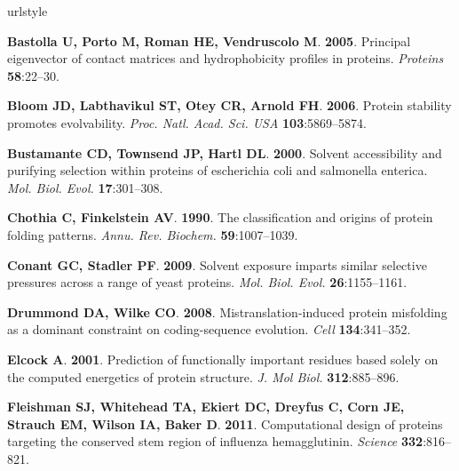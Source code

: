\documentclass[12pt]{article}
\begin{document}
\begin{thebibliography}{36}
\providecommand{\natexlab}[1]{#1}
\providecommand{\url}[1]{\texttt{#1}}
\providecommand{\urlprefix}{URL }
\expandafter\ifx\csname urlstyle\endcsname\relax
  \providecommand{\doi}[1]{doi:\discretionary{}{}{}#1}\else
  \providecommand{\doi}{doi:\discretionary{}{}{}\begingroup
  \urlstyle{rm}\Url}\fi

\textbf{Bastolla U, Porto M, Roman HE, Vendruscolo M}. \textbf{2005}.
\newblock Principal eigenvector of contact matrices and hydrophobicity profiles
  in proteins.
\newblock \emph{Proteins} \textbf{58}:22--30.

\textbf{Bloom JD, Labthavikul ST, Otey CR, Arnold FH}. \textbf{2006}.
\newblock Protein stability promotes evolvability.
\newblock \emph{Proc. Natl. Acad. Sci. USA} \textbf{103}:5869--5874.

\textbf{Bustamante CD, Townsend JP, Hartl DL}. \textbf{2000}.
\newblock Solvent accessibility and purifying selection within proteins of
  escherichia coli and salmonella enterica.
\newblock \emph{Mol. Biol. Evol.} \textbf{17}:301--308.

\textbf{Chothia C, Finkelstein AV}. \textbf{1990}.
\newblock The classification and origins of protein folding patterns.
\newblock \emph{Annu. Rev. Biochem.} \textbf{59}:1007--1039.

\textbf{Conant GC, Stadler PF}. \textbf{2009}.
\newblock Solvent exposure imparts similar selective pressures across a range
  of yeast proteins.
\newblock \emph{Mol. Biol. Evol.} \textbf{26}:1155--1161.

\textbf{Drummond DA, Wilke CO}. \textbf{2008}.
\newblock Mistranslation-induced protein misfolding as a dominant constraint on
  coding-sequence evolution.
\newblock \emph{Cell} \textbf{134}:341--352.

\textbf{Elcock A}. \textbf{2001}.
\newblock Prediction of functionally important residues based solely on the
  computed energetics of protein structure.
\newblock \emph{J. Mol Biol.} \textbf{312}:885--896.

\textbf{Fleishman SJ, Whitehead TA, Ekiert DC, Dreyfus C, Corn JE, Strauch EM,
  Wilson IA, Baker D}. \textbf{2011}.
\newblock Computational design of proteins targeting the conserved stem region
  of influenza hemagglutinin.
\newblock \emph{Science} \textbf{332}:816--821.


\end{thebibliography}
\end{document}
